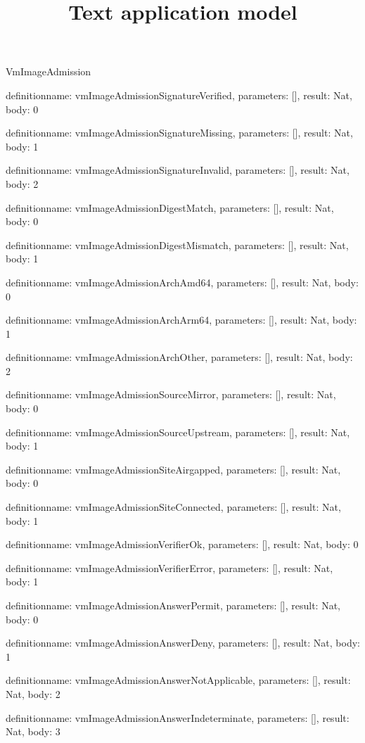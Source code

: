 \begin{lexlean}{VmImageAdmission}
\title{Text application model}
\begin{semanticmodule}
definition{name: vmImageAdmissionSignatureVerified, parameters: [], result: Nat, body: 0}

definition{name: vmImageAdmissionSignatureMissing, parameters: [], result: Nat, body: 1}

definition{name: vmImageAdmissionSignatureInvalid, parameters: [], result: Nat, body: 2}

definition{name: vmImageAdmissionDigestMatch, parameters: [], result: Nat, body: 0}

definition{name: vmImageAdmissionDigestMismatch, parameters: [], result: Nat, body: 1}

definition{name: vmImageAdmissionArchAmd64, parameters: [], result: Nat, body: 0}

definition{name: vmImageAdmissionArchArm64, parameters: [], result: Nat, body: 1}

definition{name: vmImageAdmissionArchOther, parameters: [], result: Nat, body: 2}

definition{name: vmImageAdmissionSourceMirror, parameters: [], result: Nat, body: 0}

definition{name: vmImageAdmissionSourceUpstream, parameters: [], result: Nat, body: 1}

definition{name: vmImageAdmissionSiteAirgapped, parameters: [], result: Nat, body: 0}

definition{name: vmImageAdmissionSiteConnected, parameters: [], result: Nat, body: 1}

definition{name: vmImageAdmissionVerifierOk, parameters: [], result: Nat, body: 0}

definition{name: vmImageAdmissionVerifierError, parameters: [], result: Nat, body: 1}

definition{name: vmImageAdmissionAnswerPermit, parameters: [], result: Nat, body: 0}

definition{name: vmImageAdmissionAnswerDeny, parameters: [], result: Nat, body: 1}

definition{name: vmImageAdmissionAnswerNotApplicable, parameters: [], result: Nat, body: 2}

definition{name: vmImageAdmissionAnswerIndeterminate, parameters: [], result: Nat, body: 3}


\end{semanticmodule}
\end{lexlean}
